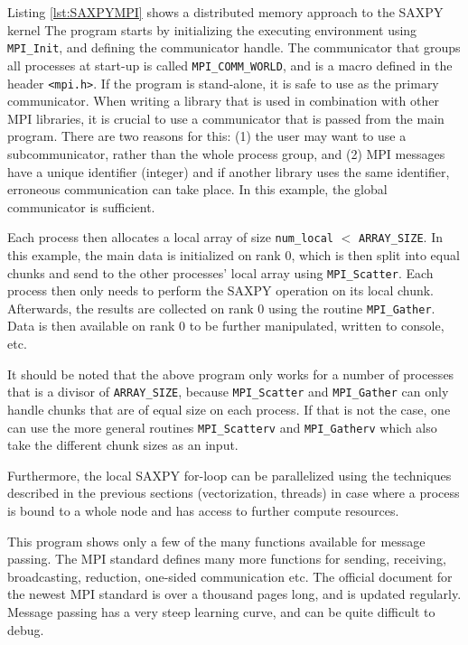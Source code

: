 Listing \ref{lst:SAXPYMPI} shows a distributed memory approach to the SAXPY kernel
\noindent The program starts by initializing the executing environment using \texttt{MPI{\_}Init}, and defining the communicator handle. The communicator that groups all processes at start-up is called \texttt{MPI{\_}COMM{\_}WORLD}, and is a macro defined in the header \texttt{<mpi.h>}. If the program is stand-alone, it is safe to use as the primary communicator. When writing a library that is used in combination with other MPI libraries, it is crucial to use a communicator that is passed from the main program. There are two reasons for this: (1) the user may want to use a subcommunicator, rather than the whole process group, and (2) MPI messages have a unique identifier (integer) and if another library uses the same identifier, erroneous communication can take place. In this example, the global communicator is sufficient.

Each process then allocates a local array of size \texttt{num{\_}local} $<$ \texttt{ARRAY{\_}SIZE}. In this example, the main data is initialized on rank 0, which is then split into equal chunks and send to the other processes' local array using \texttt{MPI{\_}Scatter}. Each process then only needs to perform the SAXPY operation on its local chunk. Afterwards, the results are collected on rank 0 using the routine \texttt{MPI{\_}Gather}. Data is then available on rank 0 to be further manipulated, written to console, etc. 

It should be noted that the above program only works for a number of processes that is a divisor of \texttt{ARRAY{\_}SIZE}, because \texttt{MPI{\_}Scatter} and \texttt{MPI{\_}Gather} can only handle chunks that are of equal size on each process. If that is not the case, one can use the more general routines \texttt{MPI{\_}Scatterv} and \texttt{MPI{\_}Gatherv} which also take the different chunk sizes as an input.

Furthermore, the local SAXPY for-loop can be parallelized using the techniques described in the previous sections (vectorization, threads) in case where a process is bound to a whole node and has access to further compute resources.

This program shows only a few of the many functions available for message passing. The MPI standard defines many more functions for sending, receiving, broadcasting, reduction, one-sided communication etc. The official document for the newest MPI standard \cite{MPI2021} is over a thousand pages long, and is updated regularly. Message passing has a very steep learning curve, and can be quite difficult to debug.  

